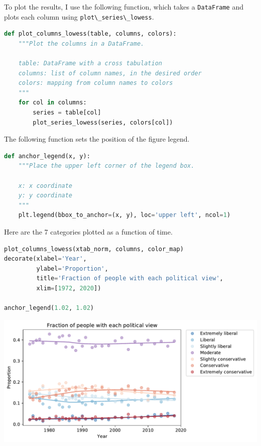 To plot the results, I use the following function, which takes a
\passthrough{\lstinline!DataFrame!} and plots each column using
\passthrough{\lstinline!plot\_series\_lowess!}.

\begin{lstlisting}[language=Python,style=source]
def plot_columns_lowess(table, columns, colors):
    """Plot the columns in a DataFrame.
    
    table: DataFrame with a cross tabulation
    columns: list of column names, in the desired order
    colors: mapping from column names to colors
    """
    for col in columns:
        series = table[col]
        plot_series_lowess(series, colors[col])
\end{lstlisting}

The following function sets the position of the figure legend.

\begin{lstlisting}[language=Python,style=source]
def anchor_legend(x, y):
    """Place the upper left corner of the legend box.
    
    x: x coordinate
    y: y coordinate
    """
    plt.legend(bbox_to_anchor=(x, y), loc='upper left', ncol=1)
\end{lstlisting}

Here are the 7 categories plotted as a function of time.

\begin{lstlisting}[language=Python,style=source]
plot_columns_lowess(xtab_norm, columns, color_map)
decorate(xlabel='Year',
         ylabel='Proportion',
         title='Fraction of people with each political view',
         xlim=[1972, 2020])

anchor_legend(1.02, 1.02)
\end{lstlisting}

\begin{center}
\includegraphics[scale=0.75]{02_polviews_files/02_polviews_87_0.pdf}
\end{center}

